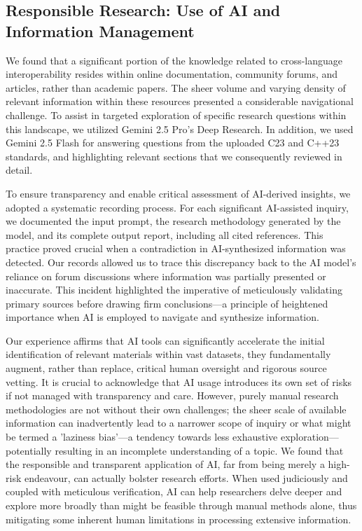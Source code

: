 \subsection{Responsible Research: Use of AI and Information Management}
We found that a significant portion of the knowledge related to cross-language interoperability resides within online documentation, community forums, and articles, rather than academic papers. The sheer volume and varying density of relevant information within these resources presented a considerable navigational challenge. To assist in targeted exploration of specific research questions within this landscape, we utilized Gemini 2.5 Pro's Deep Research. In addition, we used Gemini 2.5 Flash for answering questions from the uploaded C23 and C++23 standards, and highlighting relevant sections that we consequently reviewed in detail.

To ensure transparency and enable critical assessment of AI-derived insights, we adopted a systematic recording process. For each significant AI-assisted inquiry, we documented the input prompt, the research methodology generated by the model, and its complete output report, including all cited references. This practice proved crucial when a contradiction in AI-synthesized information was detected. Our records allowed us to trace this discrepancy back to the AI model's reliance on forum discussions where information was partially presented or inaccurate. This incident highlighted the imperative of meticulously validating primary sources before drawing firm conclusions—a principle of heightened importance when AI is employed to navigate and synthesize information.

Our experience affirms that AI tools can significantly accelerate the initial identification of relevant materials within vast datasets, they fundamentally augment, rather than replace, critical human oversight and rigorous source vetting. It is crucial to acknowledge that AI usage introduces its own set of risks if not managed with transparency and care. However, purely manual research methodologies are not without their own challenges; the sheer scale of available information can inadvertently lead to a narrower scope of inquiry or what might be termed a 'laziness bias'—a tendency towards less exhaustive exploration—potentially resulting in an incomplete understanding of a topic. We found that the responsible and transparent application of AI, far from being merely a high-risk endeavour, can actually bolster research efforts. When used judiciously and coupled with meticulous verification, AI can help researchers delve deeper and explore more broadly than might be feasible through manual methods alone, thus mitigating some inherent human limitations in processing extensive information.

